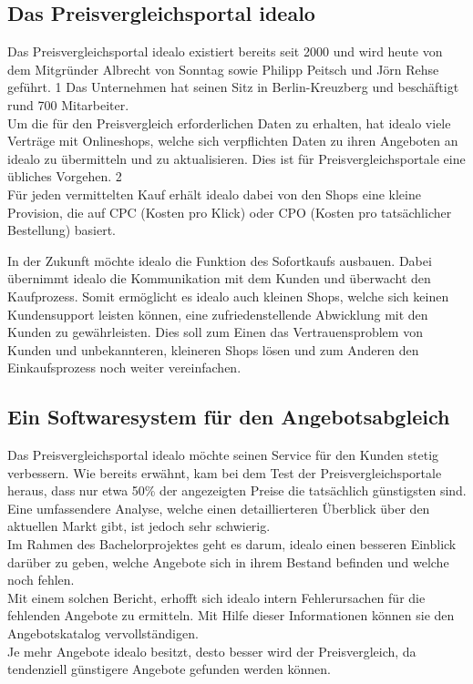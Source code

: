 \subsection{Das Preisvergleichsportal idealo}
	
	
Das Preisvergleichsportal idealo existiert bereits seit 2000 und wird heute von dem Mitgründer Albrecht von Sonntag sowie Philipp Peitsch und Jörn Rehse geführt. 1
Das Unternehmen hat seinen Sitz in Berlin-Kreuzberg und beschäftigt rund 700 Mitarbeiter.\\
Um die für den Preisvergleich erforderlichen Daten zu erhalten, hat idealo viele Verträge mit Onlineshops, welche sich verpflichten Daten zu ihren Angeboten an idealo zu übermitteln und zu aktualisieren. Dies ist für Preisvergleichsportale eine übliches Vorgehen. 2\\
Für jeden vermittelten Kauf erhält idealo dabei von den Shops eine kleine Provision, die auf CPC (Kosten pro Klick) oder CPO (Kosten pro tatsächlicher Bestellung) basiert.

In der Zukunft möchte idealo die Funktion des Sofortkaufs ausbauen. Dabei übernimmt idealo die Kommunikation mit dem Kunden und überwacht den Kaufprozess. Somit ermöglicht es idealo auch kleinen Shops, welche sich keinen Kundensupport leisten können, eine zufriedenstellende Abwicklung mit den Kunden zu gewährleisten. Dies soll zum Einen das Vertrauensproblem von Kunden und unbekannteren, kleineren Shops lösen und zum Anderen den Einkaufsprozess noch weiter vereinfachen.

\subsection{Ein Softwaresystem für den Angebotsabgleich}

Das Preisvergleichsportal idealo möchte seinen Service für den Kunden stetig verbessern. Wie bereits erwähnt, kam bei dem Test der Preisvergleichsportale heraus, dass nur etwa 50\% der angezeigten Preise die tatsächlich günstigsten sind. Eine umfassendere Analyse, welche einen detaillierteren Überblick über den aktuellen Markt gibt, ist jedoch sehr schwierig. \\
Im Rahmen des Bachelorprojektes geht es darum, idealo einen besseren Einblick darüber zu geben, welche Angebote sich in ihrem Bestand befinden und welche noch fehlen. \\
Mit einem solchen Bericht, erhofft sich idealo intern Fehlerursachen für die fehlenden Angebote zu ermitteln. Mit Hilfe dieser Informationen können sie den Angebotskatalog vervollständigen. \\
Je mehr Angebote idealo besitzt, desto besser wird der Preisvergleich, da tendenziell günstigere Angebote gefunden werden können.

